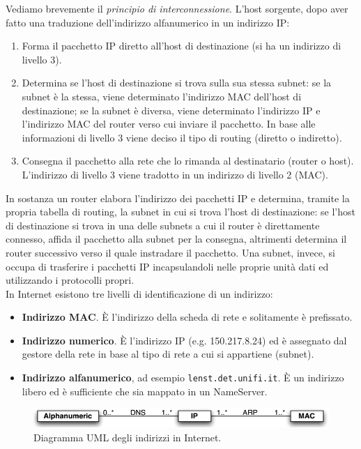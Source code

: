Vediamo brevemente il \textit{principio di interconnessione}. L'host sorgente, dopo aver fatto una traduzione dell'indirizzo alfanumerico in un indirizzo IP:
\begin{enumerate}
	\item Forma il pacchetto IP diretto all'host di destinazione (si ha un indirizzo di livello 3).
	\item Determina se l'host di destinazione si trova sulla sua stessa subnet: se la subnet è la stessa, viene determinato l'indirizzo MAC dell'host di destinazione; se la subnet è diversa, viene determinato l'indirizzo IP e l'indirizzo MAC del router verso cui inviare il pacchetto. In base alle informazioni di livello 3 viene deciso il tipo di routing (diretto o indiretto).
	\item Consegna il pacchetto alla rete che lo rimanda al destinatario (router o host). L'indirizzo di livello 3 viene tradotto in un indirizzo di livello 2 (MAC).
\end{enumerate}
In sostanza un router elabora l'indirizzo dei pacchetti IP e determina, tramite la propria tabella di routing, la subnet in cui si trova l'host di destinazione: se l'host di destinazione si trova in una delle subnets a cui il router è direttamente connesso, affida il pacchetto alla subnet per la consegna, altrimenti determina il router successivo verso il quale instradare il pacchetto. Una subnet, invece, si occupa di trasferire i pacchetti IP incapsulandoli nelle proprie unità dati ed utilizzando i protocolli propri.\\
In Internet esistono tre livelli di identificazione di un indirizzo:
\begin{itemize}
	\item \textbf{Indirizzo MAC}. È l'indirizzo della scheda di rete e solitamente è prefissato.
	\item \textbf{Indirizzo numerico}. È l'indirizzo IP (e.g. 150.217.8.24) ed è assegnato dal gestore della rete in base al tipo di rete a cui si appartiene (subnet).
	\item \textbf{Indirizzo alfanumerico}, ad esempio \texttt{lenst.det.unifi.it}. È un indirizzo libero ed è sufficiente che sia mappato in un NameServer.
\end{itemize}
\begin{figure}[htbp]
	\centering
	\includegraphics[scale = 0.5]{images/UML-address}
	\caption{Diagramma UML degli indirizzi in Internet.}
	\label{img:UML-address}
\end{figure}
